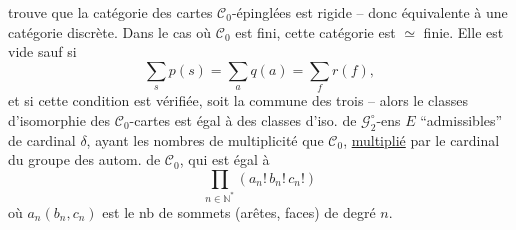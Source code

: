 trouve que la catégorie des cartes  $\mathcal C_0$-épinglées est rigide -- donc équivalente à une catégorie discrète.  Dans le cas où $\mathcal C_0$ est fini, cette catégorie est  $\simeq$ finie. Elle est vide sauf si
\[
\sum_s p(s)=\sum_a q(a)=\sum_f r(f),
\]
et si cette condition est vérifiée, soit \inserted{$\delta$} la  commune des trois -- alors le  classes d'isomorphie des $\mathcal C_0$-cartes est égal à  des classes d'iso. de $\mathcal G_2^\circ$-ens $E$ ``admissibles'' de cardinal $\delta$, ayant les   nombres de multiplicité que $\mathcal C_0$, \uline{multiplié} par le cardinal du groupe des autom. de $\mathcal C_0$, qui est égal à
\[
\prod_{n\in\mathbb N^*}(a_n!\,b_n!\,c_n!)
\]
où $a_n(b_n,c_n)$ est le nb de sommets (arêtes, faces) de degré $n$.


